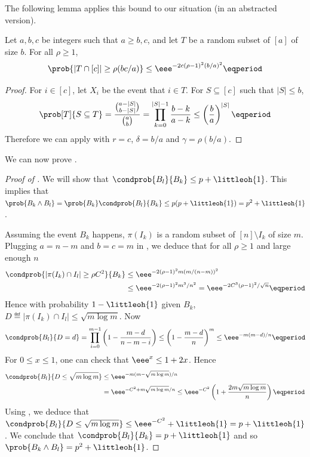 %

The following lemma applies this bound to our situation (in an abstracted version).

\begin{lemma} \label{lem:prob-est}
 Let $a,b,c$ be integers such that $a \geq b,c$, and let $T$ be a random subset of $[a]$ of size $b$. For all $\rho \geq 1$,
 \begin{equation*}
  \prob{|T \cap [c]| \geq \rho (bc/a)} \leq \eee^{-2c(\rho-1)^2(b/a)^2} \eqperiod
 \end{equation*}
\end{lemma}
\begin{proof}
 For $i \in [c]$, let $X_i$ be the event that $i \in T$. For $S \subseteq [c]$ such that $|S| \leq b$,
\begin{equation}
 \prob[T]{S \subseteq T} = \frac{\binom{a-|S|}{b-|S|}}{\binom{a}{b}} =
 \prod_{k=0}^{|S|-1} \frac{b-k}{a-k} \leq \left(\frac{b}{a}\right)^{|S|} \eqperiod
\end{equation}
 Therefore we can apply  with $r = c$, $\delta = b/a$ and $\gamma = \rho(b/a)$.
\end{proof}

We can now prove .

\begin{proof}[Proof of ]
 We will show that $\condprob{B_l}{B_k} \leq p + \littleoh{1}$. This implies that $\prob{B_k \land B_l} = \prob{B_k} \condprob{B_l}{B_k} \leq p(p + \littleoh{1}) = p^2 + \littleoh{1}$.

 Assuming the event $B_k$ happens, $\pi(I_k)$ is a random subset of $[n] \setminus I_k$ of size $m$. Plugging $a = n-m$ and $b = c = m$ in , we deduce that for all $\rho \geq 1$ and large enough $n$
 \begin{align}
  \condprob{|\pi(I_k) \cap I_l| \geq \rho C^2}{B_k} &\leq \eee^{-2(\rho-1)^2m(m/(n-m))^2} \\&\leq \eee^{-2(\rho-1)^2 m^3/n^2} = \eee^{-2C^3(\rho-1)^2/\sqrt{n}} \eqperiod
 \end{align}
 Hence with probability $1-\littleoh{1}$ given $B_k$, $D \eqdef |\pi(I_k) \cap I_l| \leq \sqrt{m\log m}$. Now
\begin{equation}
 \condprob{B_l}{D=d} = \prod_{i=0}^{m-1} \left(1 - \frac{m-d}{n-m-i}\right) \leq \left(1 - \frac{m-d}{n}\right)^m \leq \eee^{-m(m-d)/n} \eqperiod
\end{equation}
%
%
 For $0 \leq x \leq 1$, one can check that $\eee^x \leq 1 + 2x$. Hence
\begin{align}
 \condprob{B_l}{D \leq \sqrt{m\log m}} &\leq \eee^{-m(m-\sqrt{m\log m})/n} \\ &= \eee^{-C^2+m\sqrt{m\log m}/n} \leq \eee^{-C^2} \left(1 + \frac{2m\sqrt{m\log m}}{n}\right) \eqperiod
\end{align}
 Using , we deduce that $\condprob{B_l}{D \leq \sqrt{m\log m}} \leq \eee^{-C^2} + \littleoh{1} = p + \littleoh{1}$.
 We conclude that $\condprob{B_l}{B_k} = p + \littleoh{1}$ and so $\prob{B_k \land B_l} = p^2 + \littleoh{1}$.
\end{proof}

